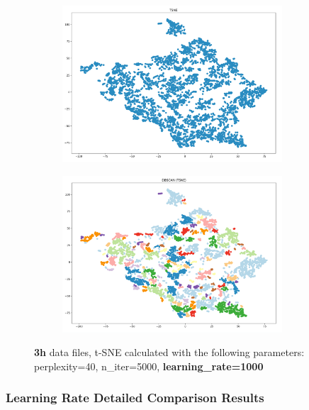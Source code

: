 \begin{figure}[H]
	\centering
	
  \centering
	\begin{subfigure}{.5\textwidth}
    \centering
    \includegraphics[width=0.9\textwidth]{./images/tsneParametersTest/learningRate/lr1000-3hTSNE.png}
  \end{subfigure}%
  \begin{subfigure}{.5\textwidth}
    \centering
    \includegraphics[width=0.9\textwidth]{./images/tsneParametersTest/learningRate/lr1000-3hDBSCAN.png}
	\end{subfigure}
	\caption{\textbf{3h} data files, t-SNE calculated with the following parameters: perplexity=40, n\_iter=5000, \textbf{learning\_rate=1000}}
  \label{figure:3hlr1000TSNE}
\end{figure}



\subsubsection{Learning Rate Detailed Comparison Results }
\label{appendix:comparelearningRateDetailed}


